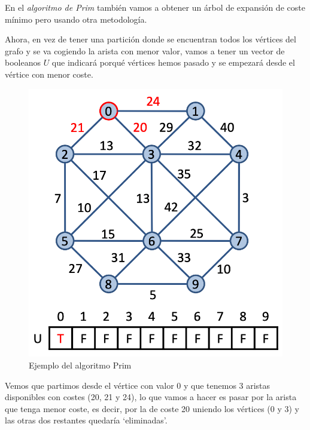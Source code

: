 En el \textit{algoritmo de Prim} también vamos a obtener un árbol de expansión de coste mínimo pero usando otra metodología.

Ahora, en vez de tener una partición donde se encuentran todos los vértices del grafo y se va cogiendo la arista con menor valor, vamos a tener un vector de booleanos \(U\) que indicará porqué vértices hemos pasado y se empezará desde el vértice con menor coste.

\begin{figure}[h]
  \begin{center}
    \includegraphics[width=.5\textwidth]{assets/prim1.png}
  \end{center}
  \caption{Ejemplo del algoritmo Prim}
\end{figure}
\newpage
Vemos que partimos desde el vértice con valor 0 y que tenemos 3 aristas disponibles con costes (20, 21 y 24), lo que vamos a hacer es pasar por la arista que tenga menor coste, es decir, por la de coste 20 uniendo los vértices (0 y 3) y las otras dos restantes quedaría `eliminadas'.

